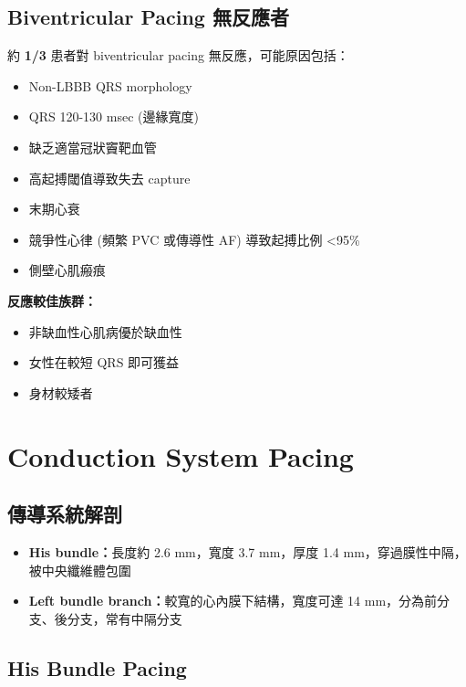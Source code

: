\documentclass[12pt,a4paper]{article}
\begin{document}
\subsection{Biventricular Pacing 無反應者}

約 \textbf{1/3} 患者對 biventricular pacing 無反應，可能原因包括：

\begin{itemize}
    \item Non-LBBB QRS morphology
    \item QRS 120-130 msec (邊緣寬度)
    \item 缺乏適當冠狀竇靶血管
    \item 高起搏閾值導致失去 capture
    \item 末期心衰
    \item 競爭性心律 (頻繁 PVC 或傳導性 AF) 導致起搏比例 <95\%
    \item 側壁心肌瘢痕
\end{itemize}

\textbf{反應較佳族群：}
\begin{itemize}
    \item 非缺血性心肌病優於缺血性
    \item 女性在較短 QRS 即可獲益
    \item 身材較矮者
\end{itemize}

\section{Conduction System Pacing}

\subsection{傳導系統解剖}

\begin{itemize}
    \item \textbf{His bundle：}長度約 2.6 mm，寬度 3.7 mm，厚度 1.4 mm，穿過膜性中隔，被中央纖維體包圍
    \item \textbf{Left bundle branch：}較寬的心內膜下結構，寬度可達 14 mm，分為前分支、後分支，常有中隔分支
\end{itemize}

\subsection{His Bundle Pacing}
\end{document}
